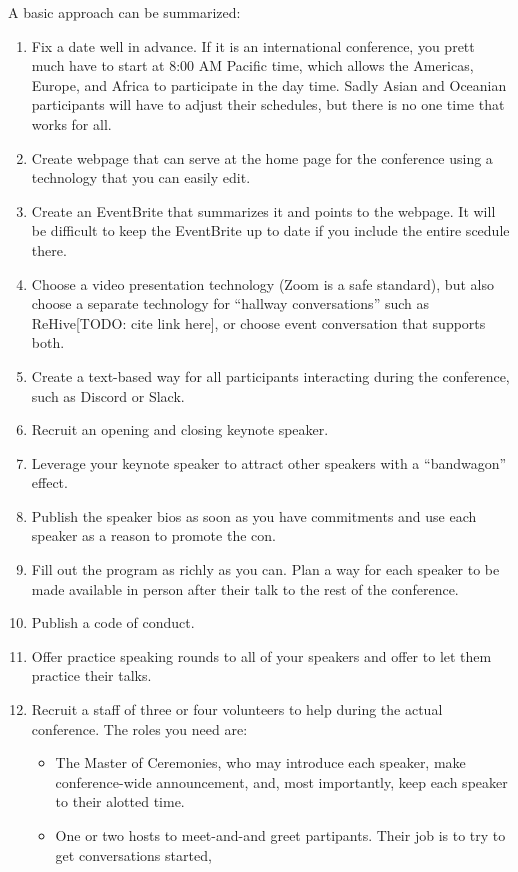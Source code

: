 \documentclass[
	fontsize=10pt, %
	twoside=false, %
	secnumdepth=1, %
]{kaobook}
\begin{document}
A basic approach can be summarized:
\begin{enumerate}
\item Fix a date well in advance. If it is an international conference, you prett much have
  to start at 8:00 AM Pacific time, which allows the Americas, Europe, and Africa to
  participate in the day time. Sadly Asian and Oceanian participants will have to adjust
  their schedules, but there is no one time that works for all.
\item Create webpage that can serve at the home page for the conference using a technology
  that you can easily edit.
\item Create an EventBrite that summarizes it and points to the webpage. It will be
  difficult to keep the EventBrite up to date if you include the entire scedule there.
\item Choose a video presentation technology (Zoom is a safe standard), but also
  choose a separate technology for ``hallway conversations'' such as ReHive[TODO: cite link here], or choose event conversation
  that supports both.
  \item Create a text-based way for all participants interacting during the conference, such as Discord or Slack.
\item Recruit an opening and closing keynote speaker.
\item Leverage your keynote speaker to attract other speakers with a ``bandwagon'' effect.
\item Publish the speaker bios as soon as you have commitments and use each speaker
  as a reason to promote the con.
\item Fill out the program as richly as you can. Plan a way for each speaker to be made
  available in person after their talk to the rest of the conference.
\item Publish a code of conduct.
\item Offer practice speaking rounds to all of your speakers and offer to let them practice their talks.
\item Recruit a staff of three or four volunteers to help during the actual conference. The roles you need are:
  \begin{itemize}
  \item The Master of Ceremonies, who may introduce each speaker, make conference-wide announcement, and,
    most importantly, keep each speaker to their alotted time.
  \item One or two hosts to meet-and-and greet partipants. Their job is to try to get conversations started,

\end{itemize}
\end{enumerate}
\end{document}
